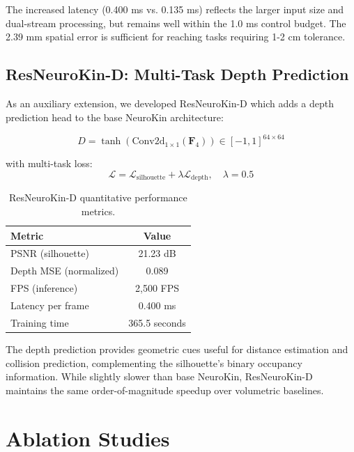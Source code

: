 \documentclass[12pt,a4paper,oneside]{report}
\begin{document}
The increased latency (0.400 ms vs. 0.135 ms) reflects the larger input size and dual-stream processing, but remains well within the 1.0 ms control budget. The 2.39 mm spatial error is sufficient for reaching tasks requiring 1-2 cm tolerance.

\subsection{ResNeuroKin-D: Multi-Task Depth Prediction}

As an auxiliary extension, we developed ResNeuroKin-D which adds a depth prediction head to the base NeuroKin architecture:

\begin{equation}
\hat{D} = \tanh(\text{Conv2d}_{1\times1}(\mathbf{F}_4)) \in [-1, 1]^{64 \times 64}
\end{equation}

with multi-task loss:
\begin{equation}
\mathcal{L} = \mathcal{L}_{\text{silhouette}} + \lambda \mathcal{L}_{\text{depth}}, \quad \lambda = 0.5
\end{equation}

\begin{table}[H]
\centering
\caption{ResNeuroKin-D quantitative performance metrics.}
\label{tab:resneurokin_performance}
\begin{tabular}{lc}
\toprule
Metric & Value \\
\midrule
PSNR (silhouette) & 21.23 dB \\
Depth MSE (normalized) & 0.089 \\
FPS (inference) & 2,500 FPS \\
Latency per frame & 0.400 ms \\
Training time & 365.5 seconds \\
\bottomrule
\end{tabular}
\end{table}

The depth prediction provides geometric cues useful for distance estimation and collision prediction, complementing the silhouette's binary occupancy information. While slightly slower than base NeuroKin, ResNeuroKin-D maintains the same order-of-magnitude speedup over volumetric baselines.

\section{Ablation Studies}
\end{document}
